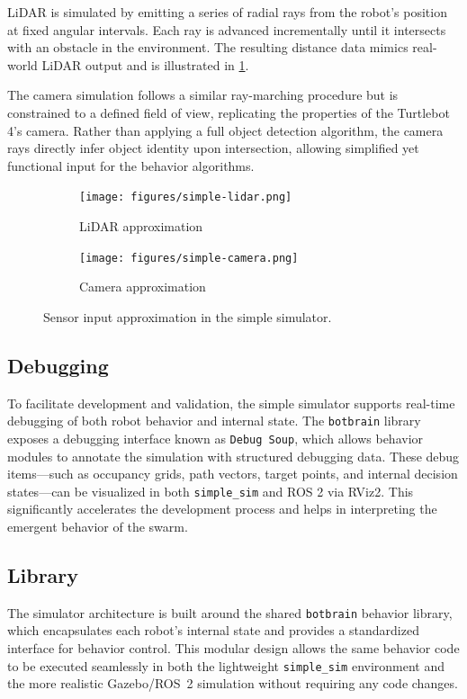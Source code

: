 LiDAR is simulated by emitting a series of radial rays from the robot's position at fixed angular intervals. Each ray is advanced incrementally until it intersects with an obstacle in the environment. The resulting distance data mimics real-world LiDAR output and is illustrated in \cref{fig:lidar-approximation}.

The camera simulation follows a similar ray-marching procedure but is constrained to a defined field of view, replicating the properties of the Turtlebot 4’s camera. Rather than applying a full object detection algorithm, the camera rays directly infer object identity upon intersection, allowing simplified yet functional input for the behavior algorithms.

\begin{figure}
    \centering
    \begin{subfigure}[b]{0.45\textwidth}
        \centering
        \texttt{[image: figures/simple-lidar.png]}
        \caption{LiDAR approximation}
        \label{fig:lidar-approximation}
    \end{subfigure}
    \hfill
    \begin{subfigure}[b]{0.45\textwidth}
        \centering
        \texttt{[image: figures/simple-camera.png]}
        \caption{Camera approximation}
        \label{fig:camera-approximation}
    \end{subfigure}
    \caption{Sensor input approximation in the simple simulator.}
    \label{fig:sensor-approximation}
\end{figure}

\subsection{Debugging}
To facilitate development and validation, the simple simulator supports real-time debugging of both robot behavior and internal state. The \texttt{botbrain} library exposes a debugging interface known as \texttt{Debug Soup}, which allows behavior modules to annotate the simulation with structured debugging data. These debug items—such as occupancy grids, path vectors, target points, and internal decision states—can be visualized in both \texttt{simple\_sim} and ROS 2 via RViz2. This significantly accelerates the development process and helps in interpreting the emergent behavior of the swarm.

\subsection{Library}
The simulator architecture is built around the shared \texttt{botbrain} behavior library, which encapsulates each robot’s internal state and provides a standardized interface for behavior control. This modular design allows the same behavior code to be executed seamlessly in both the lightweight \texttt{simple\_sim} environment and the more realistic Gazebo/ROS~2 simulation without requiring any code changes.

